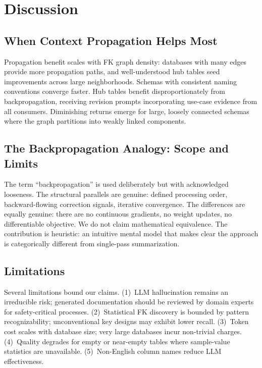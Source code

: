 \documentclass[sigconf, nonacm]{acmart}
\begin{document}
\section{Discussion}\label{sec:discussion}

\subsection{When Context Propagation Helps Most}

Propagation benefit scales with FK graph density: databases with many edges provide more propagation paths, and well-understood hub tables seed improvements across large neighborhoods. Schemas with consistent naming conventions converge faster. Hub tables benefit disproportionately from backpropagation, receiving revision prompts incorporating use-case evidence from all consumers. Diminishing returns emerge for large, loosely connected schemas where the graph partitions into weakly linked components.

\subsection{The Backpropagation Analogy: Scope and Limits}\label{sec:backprop-limits}

The term ``backpropagation'' is used deliberately but with acknowledged looseness. The structural parallels are genuine: defined processing order, backward-flowing correction signals, iterative convergence. The differences are equally genuine: there are no continuous gradients, no weight updates, no differentiable objective. We do not claim mathematical equivalence. The contribution is heuristic: an intuitive mental model that makes clear the approach is categorically different from single-pass summarization.

\subsection{Limitations}

Several limitations bound our claims. (1)~LLM hallucination remains an irreducible risk; generated documentation should be reviewed by domain experts for safety-critical processes. (2)~Statistical FK discovery is bounded by pattern recognizability; unconventional key designs may exhibit lower recall. (3)~Token cost scales with database size; very large databases incur non-trivial charges. (4)~Quality degrades for empty or near-empty tables where sample-value statistics are unavailable. (5)~Non-English column names reduce LLM effectiveness.
\end{document}
